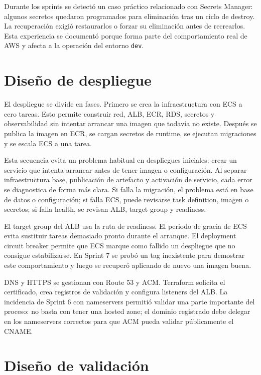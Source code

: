 Durante los sprints se detectó un caso práctico relacionado con Secrets Manager: algunos secretos quedaron programados para eliminación tras un ciclo de destroy. La recuperación exigió restaurarlos o forzar su eliminación antes de recrearlos. Esta experiencia se documentó porque forma parte del comportamiento real de AWS y afecta a la operación del entorno \texttt{dev}.

\section{Diseño de despliegue}
\label{sec:diseno-despliegue-detallado}

El despliegue se divide en fases. Primero se crea la infraestructura con ECS a cero tareas. Esto permite construir red, ALB, ECR, RDS, secretos y observabilidad sin intentar arrancar una imagen que todavía no existe. Después se publica la imagen en ECR, se cargan secretos de runtime, se ejecutan migraciones y se escala ECS a una tarea.

Esta secuencia evita un problema habitual en despliegues iniciales: crear un servicio que intenta arrancar antes de tener imagen o configuración. Al separar infraestructura base, publicación de artefacto y activación de servicio, cada error se diagnostica de forma más clara. Si falla la migración, el problema está en base de datos o configuración; si falla ECS, puede revisarse task definition, imagen o secretos; si falla health, se revisan ALB, target group y readiness.

El target group del ALB usa la ruta de readiness. El periodo de gracia de ECS evita sustituir tareas demasiado pronto durante el arranque. El deployment circuit breaker permite que ECS marque como fallido un despliegue que no consigue estabilizarse. En Sprint 7 se probó un tag inexistente para demostrar este comportamiento y luego se recuperó aplicando de nuevo una imagen buena.

DNS y HTTPS se gestionan con Route 53 y ACM. Terraform solicita el certificado, crea registros de validación y configura listeners del ALB. La incidencia de Sprint 6 con nameservers permitió validar una parte importante del proceso: no basta con tener una hosted zone; el dominio registrado debe delegar en los nameservers correctos para que ACM pueda validar públicamente el CNAME.

\section{Diseño de validación}
\label{sec:diseno-validacion}

